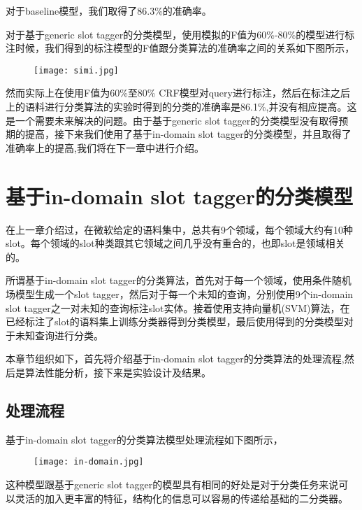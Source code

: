 \documentclass[master]{njuthesis}
\begin{document}
    对于baseline模型，我们取得了86.3\%的准确率。
    
    对于基于generic slot tagger的分类模型，使用模拟的F值为60\%-80\%的模型进行标注时候，我们得到的标注模型的F值跟分类算法的准确率之间的关系如下图所示，

    \begin{figure}[htbp]
      \centering
      \texttt{[image: simi.jpg]}
      \caption{}\label{fig:test1}
    \end{figure}
    
    然而实际上在使用F值为60\%至80\% CRF模型对query进行标注，然后在标注之后上的语料进行分类算法的实验时得到的分类的准确率是86.1\%,并没有相应提高。这是一个需要未来解决的问题。由于基于generic slot tagger的分类模型没有取得预期的提高，接下来我们使用了基于in-domain slot tagger的分类模型，并且取得了准确率上的提高,我们将在下一章中进行介绍。

\section{基于in-domain slot tagger的分类模型}

    在上一章介绍过，在微软给定的语料集中，总共有9个领域，每个领域大约有10种slot。每个领域的slot种类跟其它领域之间几乎没有重合的，也即slot是领域相关的。

    所谓基于in-domain slot tagger的分类算法，首先对于每一个领域，使用条件随机场模型生成一个slot tagger，然后对于每一个未知的查询，分别使用9个in-domain slot tagger之一对未知的查询标注slot实体。接着使用支持向量机(SVM)算法，在已经标注了slot的语料集上训练分类器得到分类模型，最后使用得到的分类模型对于未知查询进行分类。
    
    本章节组织如下，首先将介绍基于in-domain slot tagger的分类算法的处理流程,然后是算法性能分析，接下来是实验设计及结果。

\subsection{处理流程}

    基于in-domain slot tagger的分类算法模型处理流程如下图所示，
    \begin{figure}[htbp]
      \centering
      \texttt{[image: in-domain.jpg]}
      \caption{}\label{fig:test1}
    \end{figure}
    
    这种模型跟基于generic slot tagger的模型具有相同的好处是对于分类任务来说可以灵活的加入更丰富的特征，结构化的信息可以容易的传递给基础的二分类器。
\end{document}
